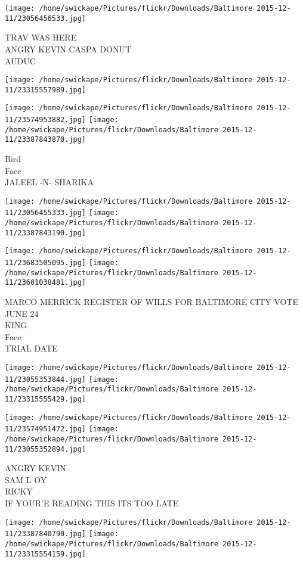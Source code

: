 \documentclass[10pt,letterpaper]{article}
\begin{document}
\texttt{[image: /home/swickape/Pictures/flickr/Downloads/Baltimore 2015-12-11/23056456533.jpg]}

TRAV WAS HERE\\
ANGRY KEVIN CASPA DONUT\\
AUDUC
\pagebreak

\texttt{[image: /home/swickape/Pictures/flickr/Downloads/Baltimore 2015-12-11/23315557989.jpg]}

\vspace{0.25in}
\texttt{[image: /home/swickape/Pictures/flickr/Downloads/Baltimore 2015-12-11/23574953882.jpg]}
\texttt{[image: /home/swickape/Pictures/flickr/Downloads/Baltimore 2015-12-11/23387843870.jpg]}

Bird\\
Face\\
JALEEL {-}N{-} SHARIKA
\pagebreak

\texttt{[image: /home/swickape/Pictures/flickr/Downloads/Baltimore 2015-12-11/23056455333.jpg]}
\texttt{[image: /home/swickape/Pictures/flickr/Downloads/Baltimore 2015-12-11/23387843190.jpg]}

\texttt{[image: /home/swickape/Pictures/flickr/Downloads/Baltimore 2015-12-11/23683505095.jpg]}
\texttt{[image: /home/swickape/Pictures/flickr/Downloads/Baltimore 2015-12-11/23601038481.jpg]}

MARCO MERRICK REGISTER OF WILLS FOR BALTIMORE CITY VOTE JUNE 24\\
KING\\
Face\\
TRIAL DATE
\pagebreak

\texttt{[image: /home/swickape/Pictures/flickr/Downloads/Baltimore 2015-12-11/23055353844.jpg]}
\texttt{[image: /home/swickape/Pictures/flickr/Downloads/Baltimore 2015-12-11/23315555429.jpg]}

\texttt{[image: /home/swickape/Pictures/flickr/Downloads/Baltimore 2015-12-11/23574951472.jpg]}
\texttt{[image: /home/swickape/Pictures/flickr/Downloads/Baltimore 2015-12-11/23055352894.jpg]}

ANGRY KEVIN\\
SAM L OY\\
RICKY\\
IF YOUR'E READING THIS ITS TOO LATE
\pagebreak

\texttt{[image: /home/swickape/Pictures/flickr/Downloads/Baltimore 2015-12-11/23387840790.jpg]}
\texttt{[image: /home/swickape/Pictures/flickr/Downloads/Baltimore 2015-12-11/23315554159.jpg]}
\end{document}
